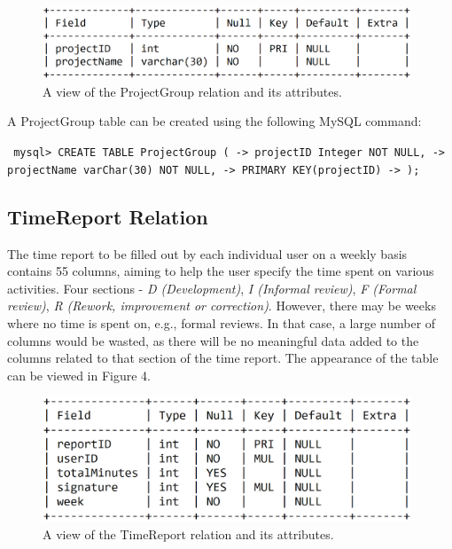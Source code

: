 \documentclass{article}
\begin{document}
\begin{figure}[H]
     \centering
     \includegraphics[width=11cm]{images/SQL_tables/projectgroup.png}
     \renewcommand\figurename{Figure}
     \caption{A view of the ProjectGroup relation and its attributes.}
     \label{fig:my_label}
 \end{figure}
\newline

A ProjectGroup table can be created using the following MySQL command:
\newline

\small
\texttt{
\noindent mysql> CREATE TABLE ProjectGroup (\newline
\indent\indent\indent -> projectID Integer NOT NULL,\newline
\indent\indent\indent -> projectName varChar(30) NOT NULL,\newline
\indent\indent\indent -> PRIMARY KEY(projectID)\newline
\indent\indent\indent -> );
}
\normalsize

\subsection{TimeReport Relation}
The time report to be filled out by each individual user on a weekly basis contains 55 columns, aiming to help the user specify the time spent on various activities. Four sections - \emph{D (Development)}, \emph{I (Informal review)}, \emph{F (Formal review)}, \emph{R (Rework, improvement or correction)}. However, there may be weeks where no time is spent on, e.g.,  formal reviews. In that case, a large number of columns would be wasted, as there will be no meaningful data added to the columns related to that section of the time report.  The appearance of the table can be viewed in Figure 4.

\begin{figure}[H]
     \centering
     \includegraphics[width=11cm]{images/SQL_tables/timereport.png}
     \renewcommand\figurename{Figure}
     \caption{A view of the TimeReport relation and its attributes.}
     \label{fig:my_label}
 \end{figure}
\newline
\end{document}
